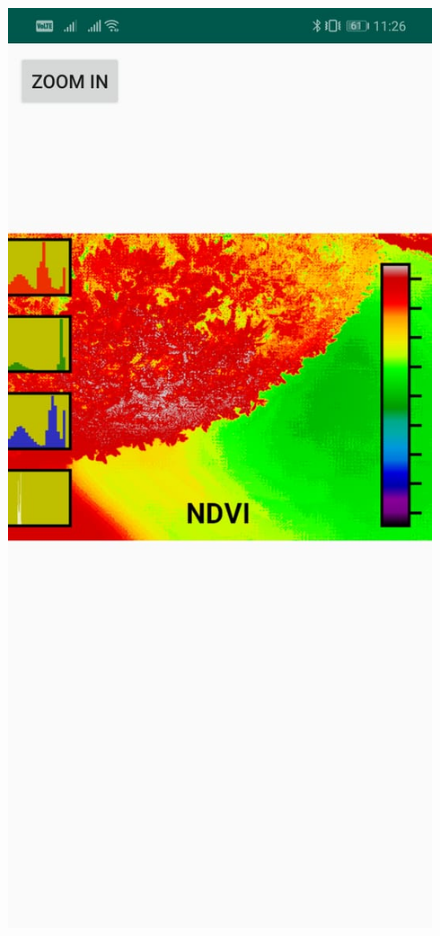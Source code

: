 \begin{figure}[H]
    \includegraphics[scale=0.17]{SummerInterReport/project/Images-Major/app4.jpeg}

\end{figure}
